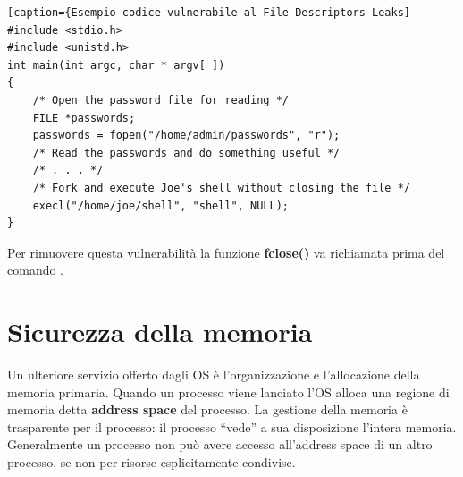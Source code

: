 \begin{algorithm}
\begin{lstlisting}
[caption={Esempio codice vulnerabile al File Descriptors Leaks]
#include <stdio.h>
#include <unistd.h>
int main(int argc, char * argv[ ])
{
	/* Open the password file for reading */
	FILE *passwords;
	passwords = fopen("/home/admin/passwords", "r");
	/* Read the passwords and do something useful */
	/* . . . */
	/* Fork and execute Joe's shell without closing the file */
	execl("/home/joe/shell", "shell", NULL);
}
\end{lstlisting}
\end{algorithm}
Per rimuovere questa vulnerabilità la funzione \textbf{fclose()} va richiamata prima del comando .

\section{Sicurezza della memoria}
Un ulteriore servizio offerto dagli OS è l'organizzazione e l’allocazione della memoria primaria. Quando un processo viene lanciato l'OS alloca una regione di memoria detta \textbf{address space} del processo. La gestione della memoria è trasparente per il processo: il processo “vede” a sua disposizione l’intera memoria. Generalmente un processo non può avere accesso all'address space di un altro processo, se non per risorse esplicitamente condivise. \newline \newline


